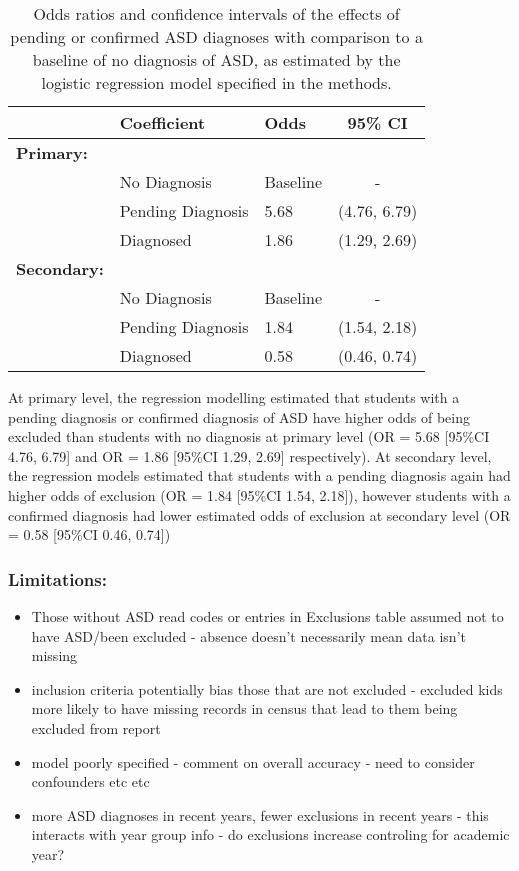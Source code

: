 \documentclass[
]{article}
\providecommand{\tightlist}{%
  \setlength{\itemsep}{0pt}\setlength{\parskip}{0pt}}
\begin{document}
\begin{table}[h]
\centering
\renewcommand*{\arraystretch}{1.2}
\begin{scriptsize}\begin{tabular}{lllc}
\toprule
& \textbf{Coefficient} & \textbf{Odds} & \textbf{95\% CI} \\
\midrule
\textbf{Primary:} & & & \\
& No Diagnosis & Baseline & - \\
& Pending Diagnosis & 5.68 & (4.76, 6.79) \\
& Diagnosed & 1.86 & (1.29, 2.69) \\ 
\textbf{Secondary:} & & & \\
& No Diagnosis & Baseline & - \\
& Pending Diagnosis & 1.84 & (1.54, 2.18) \\
& Diagnosed & 0.58 & (0.46, 0.74) \\ 
\bottomrule
\end{tabular}\end{scriptsize}
\caption{Odds ratios and confidence intervals of the effects of pending or confirmed ASD diagnoses with comparison to a baseline of no diagnosis of ASD, as estimated by the logistic regression model specified in the methods.}
\label{tab:model_summary}
\end{table}

At primary level, the regression modelling estimated that students with
a pending diagnosis or confirmed diagnosis of ASD have higher odds of
being excluded than students with no diagnosis at primary level (OR =
5.68 {[}95\%CI 4.76, 6.79{]} and OR = 1.86 {[}95\%CI 1.29, 2.69{]}
respectively). At secondary level, the regression models estimated that
students with a pending diagnosis again had higher odds of exclusion (OR
= 1.84 {[}95\%CI 1.54, 2.18{]}), however students with a confirmed
diagnosis had lower estimated odds of exclusion at secondary level (OR =
0.58 {[}95\%CI 0.46, 0.74{]})

\hypertarget{limitations}{%
\subsubsection{Limitations:}\label{limitations}}

\begin{itemize}
\tightlist
\item
  Those without ASD read codes or entries in Exclusions table assumed
  not to have ASD/been excluded - absence doesn't necessarily mean data
  isn't missing
\item
  inclusion criteria potentially bias those that are not excluded -
  excluded kids more likely to have missing records in census that lead
  to them being excluded from report
\item
  model poorly specified - comment on overall accuracy - need to
  consider confounders etc etc
\item
  more ASD diagnoses in recent years, fewer exclusions in recent years -
  this interacts with year group info - do exclusions increase
  controling for academic year?
\end{itemize}
\end{document}
